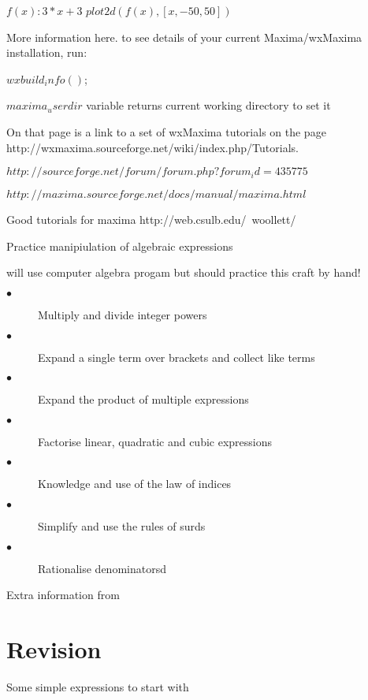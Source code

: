 \documentclass[11pt]{article}
\begin{document}
$f(x): 3*x+3$
$plot2d(f(x), [x,-50,50])$


More information here.
to see details of your current Maxima/wxMaxima installation, run:

$wxbuild_info()$;





$maxima_userdir$   variable returns current working directory to set it

On that page is a link to a set of wxMaxima tutorials on the page
http://wxmaxima.sourceforge.net/wiki/index.php/Tutorials.


$http://sourceforge.net/forum/forum.php?forum_id=435775$



$http://maxima.sourceforge.net/docs/manual/maxima.html$




Good tutorials for maxima
http://web.csulb.edu/~woollett/

Practice manipiulation of algebraic expressions

will use computer algebra progam but should practice this craft by hand!


\begin{description}
\item[$\bullet$] Multiply and divide integer powers
\item[$\bullet$] Expand a single term over brackets and collect like terms
\item[$\bullet$] Expand the product of multiple expressions
\item[$\bullet$] Factorise linear, quadratic and cubic expressions
\item[$\bullet$] Knowledge and use of the law of indices
\item[$\bullet$] Simplify and use the rules of surds
\item[$\bullet$] Rationalise denominatorsd
\end{description}

Extra information from \cite{khanacademyalgebra1}


\section{Revision}\label{S2}

Some simple expressions to start with


\end{document}
